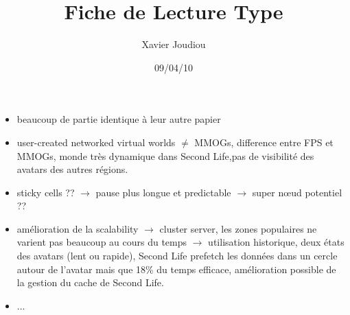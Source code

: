 \documentclass[11pt,a4paper]{article}
\title{Fiche de Lecture Type}
\author{Xavier Joudiou}
\date{09/04/10}
\begin{document}
	
  \begin{itemize}
  \renewcommand{\labelitemi}{$\Rightarrow$}
	\item beaucoup de partie identique à leur autre papier
	\item user-created networked virtual worlds $\ne$ MMOGs, difference entre FPS et MMOGs, monde très dynamique dans Second Life,pas de visibilité des avatars des autres régions.
	\item sticky cells ?? $\rightarrow$ pause plus longue et predictable $\rightarrow$ super nœud potentiel ??
	\item amélioration de la scalability $\rightarrow$ cluster server, les zones populaires ne varient pas beaucoup au cours du temps $\rightarrow$ utilisation historique, deux états des avatars (lent ou rapide), Second Life prefetch les données dans un cercle autour de l'avatar mais que 18\% du temps efficace, amélioration possible de la gestion du cache de Second Life.
	\item ...
  \end{itemize}
\end{document}
